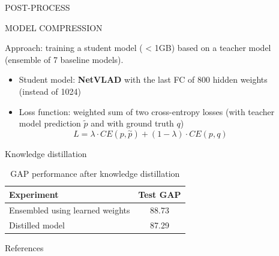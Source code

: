 \documentclass[final]{beamer}
\newlength{\sepwidth}
\newlength{\colwidth}
\newcommand{\separatorcolumn}{\begin{column}{\sepwidth}\end{column}}
\begin{document}
\begin{frame}[t]
\begin{columns}[t]
\begin{column}{\colwidth}
\begin{block}{POST-PROCESS}
  \end{block}

  \begin{block}{MODEL COMPRESSION}

    Approach: training a student model ( < 1GB) based on a teacher model (ensemble of 7 baseline models).
    \begin{itemize}
		\item Student model: \textbf{NetVLAD} with the last FC of 800 hidden weights (instead of 1024)
        \item Loss function: weighted sum of two cross-entropy losses (with teacher model prediction $\tilde{p}$ and with ground truth $q$)
        \begin{equation}
        	L=\lambda\cdot CE(p,\overset{\sim}{p}) + (1-\lambda)\cdot CE(p,q)
        \end{equation}
    \end{itemize}
  \end{block}
  
    \begin{alertblock}{Knowledge distillation}
      \begin{table}[h!]
      \begin{center}
        \begin{tabular}{ l | c }
        \toprule
          \textbf{Experiment} & \textbf{Test GAP}  \\
        \midrule
                Ensembled using learned weights & 88.73 \\
        \hline
                Distilled model & 87.29 \\
        \bottomrule
        \end{tabular}
        \caption{GAP performance after knowledge distillation}
        \label{tab:distillation}
      \end{center}
    \end{table}
  \end{alertblock}

  \begin{block}{References}

    \nocite{*}
    \footnotesize{}

  \end{block}

\end{column}

\separatorcolumn



\separatorcolumn


\end{columns}
\end{frame}
\end{document}
